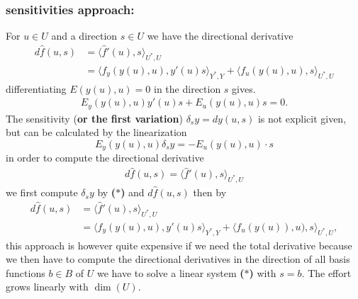 \documentclass[a4paper,11pt,fleqn]{book}
\theoremstyle{definition}
\theoremstyle{remark}
\begin{document}
\subsubsection{sensitivities approach:} For $u \in U$ and a direction $s \in U$ we have the directional derivative 
	\begin{align*}
		d\hat{f}(u, s) &= \langle \hat{f}'(u), s \rangle_{U^*, U} \\
		&= \langle f_y(y(u), u), y'(u)s \rangle_{Y^*, Y} 
		+ \langle f_u(y(u), u), s \rangle_{U^*,U}
	\end{align*}
	differentiating $E(y(u), u) = 0$ in the direction $s$ gives. 
	\begin{align*}
		E_y(y(u), u) y'(u)s + E_u(y(u), u)s = 0.
	\end{align*}
	The sensitivity (\textbf{or the first variation}) $\delta_s y = dy(u, s)$ is not explicit given, but can be calculated by the linearization
	\begin{equation}
	\tag{$*$}
		E_y(y(u), u)\delta_s y = -E_u(y(u), u) \cdot  s 
	\end{equation}
	in order to compute the directional derivative 
	\begin{align*}
		d\hat{f}(u, s) = \langle \hat{f}'(u), s \rangle_{U^*, U}
	\end{align*}
	we first compute $\delta_s y$ by \textbf{($*$)} and $d\hat{f}(u, s)$ then by 
	\begin{align*}
		d\hat{f}(u, s) &= \langle \hat{f}'(u), s \rangle_{U^*, U} \\
		&= \langle f_y(y(u), u), y'(u)s \rangle_{Y^*, Y} 
		+ \langle f_u(y(u)), u), s \rangle_{U^*,U},
	\end{align*}
	this approach is however quite expensive if we need the total derivative because we then have to compute the directional derivatives in the direction of all basis functions $b \in B$ of $U$ we have to solve a linear system \textbf{($*$)} with $s = b$. The effort grows linearly with $\dim(U)$. 
	
	
\end{document}

